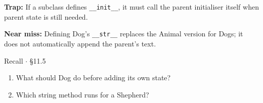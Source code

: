 \documentclass[11pt]{article}
\begin{document}
\begin{keepsection}
\begin{notebox}\textbf{Trap:} If a subclass defines \texttt{\_\_init\_\_}, it must call the parent initialiser itself when parent state is still needed.\end{notebox}

\begin{notebox}\textbf{Near miss:} Defining Dog’s \texttt{\_\_str\_\_} replaces the Animal version for Dogs; it does not automatically append the parent’s text.\end{notebox}

\begin{recallbox}{Recall \ensuremath{\cdot} §11.5}
\begin{enumerate}
\item What should Dog do before adding its own state?
\item Which string method runs for a Shepherd?
\end{enumerate}

\end{recallbox}
\end{keepsection}
\end{document}
